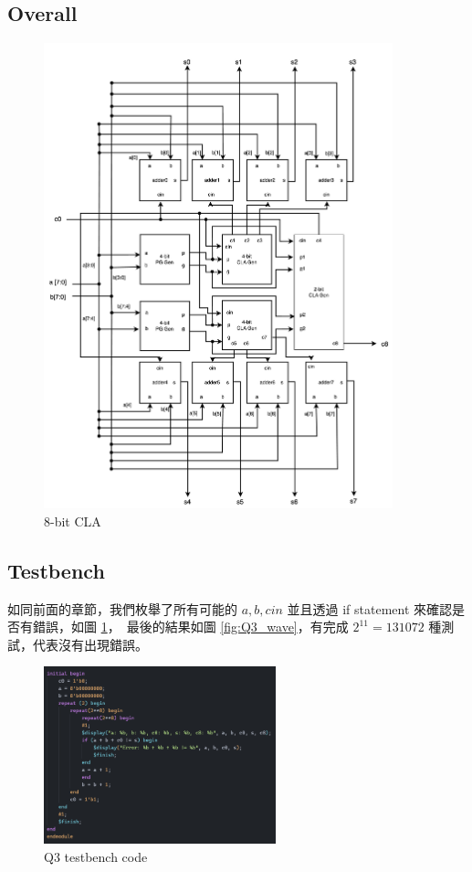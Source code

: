 \documentclass[10.5pt,compsoc,UTF8]{CjC}
\theoremstyle{mystyle}
\begin{document}
\subsection{Overall}
\begin{figure}[htp]
  \centering
  \includegraphics[width=0.9\textwidth]{8-bit_CLA.png}
  \caption{8-bit CLA}
\end{figure}

\newpage

\subsection{Testbench}

如同前面的章節，我們枚舉了所有可能的 $a, b, cin$ 並且透過 if statement 來確認是否有錯誤，如圖 \ref{fig:Q3_tb}，\
最後的結果如圖 \ref{fig:Q3_wave}，有完成 $2^{11} = 131072$ 種測試，代表沒有出現錯誤。

\begin{figure}[htp]
  \centering
  \includegraphics[width=0.6\textwidth]{Q3-tb.png}
  \caption{Q3 testbench code}
  \label{fig:Q3_tb}
\end{figure}
\end{document}
